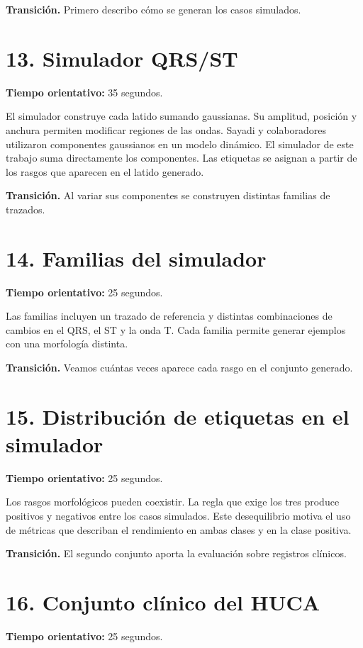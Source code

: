 \documentclass[11pt,a4paper]{article}
\begin{document}
\textbf{Transición.} Primero describo cómo se generan los casos simulados.

\section*{13. Simulador QRS/ST}
\textbf{Tiempo orientativo: }35 segundos.

El simulador construye cada latido sumando gaussianas. Su amplitud, posición y anchura permiten modificar regiones de las ondas. Sayadi y colaboradores utilizaron componentes gaussianos en un modelo dinámico. El simulador de este trabajo suma directamente los componentes. Las etiquetas se asignan a partir de los rasgos que aparecen en el latido generado.

\textbf{Transición.} Al variar sus componentes se construyen distintas familias de trazados.

\section*{14. Familias del simulador}
\textbf{Tiempo orientativo: }25 segundos.

Las familias incluyen un trazado de referencia y distintas combinaciones de cambios en el QRS, el ST y la onda T. Cada familia permite generar ejemplos con una morfología distinta.

\textbf{Transición.} Veamos cuántas veces aparece cada rasgo en el conjunto generado.

\section*{15. Distribución de etiquetas en el simulador}
\textbf{Tiempo orientativo: }25 segundos.

Los rasgos morfológicos pueden coexistir. La regla que exige los tres produce \SimPositive{} positivos y \SimNegative{} negativos entre los \SimPatients{} casos simulados. Este desequilibrio motiva el uso de métricas que describan el rendimiento en ambas clases y en la clase positiva.

\textbf{Transición.} El segundo conjunto aporta la evaluación sobre registros clínicos.

\section*{16. Conjunto clínico del HUCA}
\textbf{Tiempo orientativo: }25 segundos.
\end{document}
